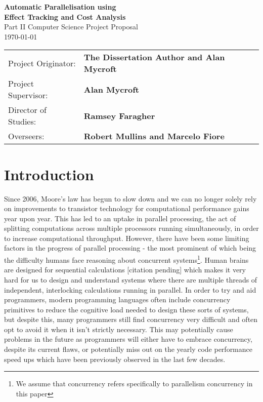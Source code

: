 \documentclass[12pt,a4paper,twoside,openright]{report}
\begin{document}

\begin{center}
  \Huge
  \textbf{Automatic Parallelisation using \\ Effect Tracking and Cost Analysis} \\[4mm]
  \Large
  Part II Computer Science Project Proposal \\[2mm]
  \today \\[8mm]
\end{center}

{\large
\begin{tabular}{ll}
  Project Originator:  & \bf The Dissertation Author and Alan Mycroft          \\
  Project Supervisor:  & \bf Alan Mycroft                \\
  Director of Studies: & \bf Ramsey Faragher                   \\
  Overseers:           & \bf Robert Mullins and Marcelo Fiore
\end{tabular}
}

\section*{Introduction}

Since 2006, Moore's law has begun to slow down and we can no longer solely rely on improvements to transistor technology for computational performance gains year upon year. This has led to an uptake in parallel processing, the act of splitting computations across multiple processors running simultaneously, in order to increase computational throughput. However, there have been some limiting factors in the progress of parallel processing - the most prominent of which being the difficulty humans face reasoning about concurrent systems\footnote{We assume that concurrency refers specifically to parallelism concurrency in this paper}. Human brains are designed for sequential calculations [citation pending] which makes it very hard for us to design and understand systems where there are multiple threads of independent, interlocking calculations running in parallel. In order to try and aid programmers, modern programming languages often include concurrency primitives to reduce the cognitive load needed to design these sorts of systems, but despite this, many programmers still find concurrency very difficult and often opt to avoid it when it isn't strictly necessary. This may potentially cause problems in the future as programmers will either have to embrace concurrency, despite its current flaws, or potentially miss out on the yearly code performance speed ups which have been previously observed in the last few decades.
\end{document}
